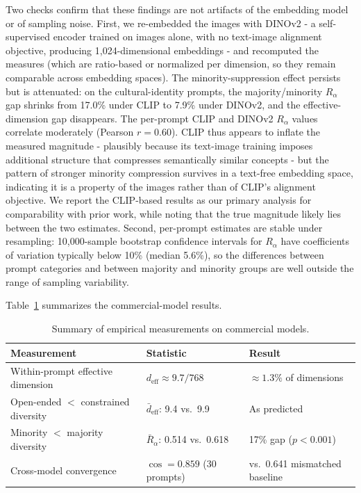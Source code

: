 \documentclass[11pt]{article}
\begin{document}
Two checks confirm that these findings are not artifacts of the embedding model or of sampling noise. First, we re-embedded the images with DINOv2 - a self-supervised encoder trained on images alone, with no text-image alignment objective, producing 1,024-dimensional embeddings - and recomputed the measures (which are ratio-based or normalized per dimension, so they remain comparable across embedding spaces). The minority-suppression effect persists but is attenuated: on the cultural-identity prompts, the majority/minority $R_\alpha$ gap shrinks from 17.0\% under CLIP to 7.9\% under DINOv2, and the effective-dimension gap disappears. The per-prompt CLIP and DINOv2 $R_\alpha$ values correlate moderately (Pearson $r = 0.60$). CLIP thus appears to inflate the measured magnitude - plausibly because its text-image training imposes additional structure that compresses semantically similar concepts - but the pattern of stronger minority compression survives in a text-free embedding space, indicating it is a property of the images rather than of CLIP's alignment objective. We report the CLIP-based results as our primary analysis for comparability with prior work, while noting that the true magnitude likely lies between the two estimates. Second, per-prompt estimates are stable under resampling: 10,000-sample bootstrap confidence intervals for $R_\alpha$ have coefficients of variation typically below 10\% (median 5.6\%), so the differences between prompt categories and between majority and minority groups are well outside the range of sampling variability.

Table~\ref{tab:summary} summarizes the commercial-model results.

\begin{table}[t]
\centering
\caption{Summary of empirical measurements on commercial models.}
\label{tab:summary}
\begin{tabular}{@{}lll@{}}
\toprule
\textbf{Measurement} & \textbf{Statistic} & \textbf{Result} \\
\midrule
Within-prompt effective dimension & $d_{\mathrm{eff}} \approx 9.7 / 768$ & $\approx 1.3\%$ of dimensions \\
Open-ended $<$ constrained diversity & $\bar{d}_{\mathrm{eff}}$: 9.4 vs.\ 9.9 & As predicted \\
Minority $<$ majority diversity & $\bar{R}_\alpha$: 0.514 vs.\ 0.618 & 17\% gap ($p < 0.001$) \\
Cross-model convergence & $\cos = 0.859$ (30 prompts) & vs.\ 0.641 mismatched baseline \\
\bottomrule
\end{tabular}
\end{table}
\end{document}

